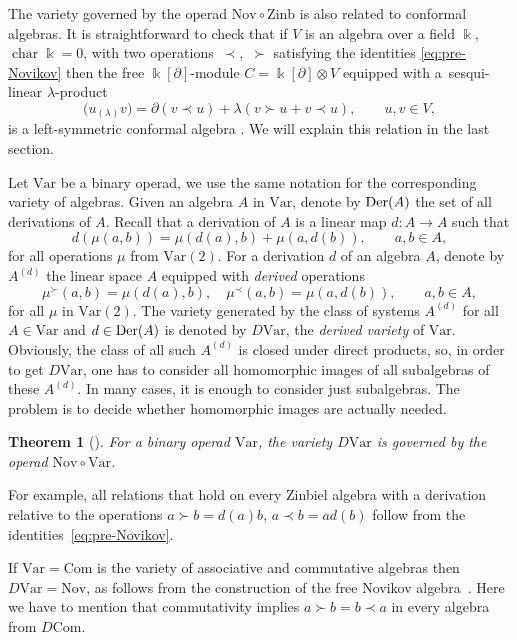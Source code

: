 \documentclass[pdftex]{sigma}
\numberwithin{equation}{section}
\newtheorem{Theorem}{Theorem}[section]
\def\Var{\mathrm{Var}}
\def\Nov{\mathrm{Nov}}
\def\Com{\mathrm{Com}}
\def\Zinb{\mathrm{Zinb}}
\def\Der {\mathop {\fam 0 Der}\nolimits}
\begin{document}
\begin{Remark}\label{rem:Conformal}
The variety governed by the operad $\Nov\circ \Zinb $
is also related to conformal algebras.
It is straightforward to check that if $V$ is an algebra over a field $\Bbbk $, $\operatorname{char}\Bbbk =0$, with two
operations~$\prec$,~$\succ $ satisfying the identities
\eqref{eq:pre-Novikov}
then the free
$\Bbbk [\partial ]$-module $C=\Bbbk[\partial ]\otimes V$
equipped with a~sesqui-linear $\lambda $-product
\[
\bigl(u{}_{(\lambda )} v\bigr) = \partial (v\prec u) + \lambda (v\succ u + v\prec u),
\qquad u,v\in V,
\]
is a left-symmetric conformal algebra \cite{HongLi2015}.
We will explain this relation in the last section.
\end{Remark}

Let $\Var $ be a binary operad, we use the same notation for the
corresponding variety of algebras.
Given an algebra $A$ in $\Var $, denote by $\Der(A) $
the set of all derivations of $A$. Recall that
a derivation of $A$ is a linear map $d\colon A\to A$
such that
\[
 d(\mu(a,b)) = \mu(d(a),b) + \mu(a,d(b)), \qquad a,b\in A,
\]
for all operations $\mu $ from $\Var (2)$.
For a derivation $d$ of an algebra $A$, denote by
$A^{(d)}$ the linear space $A$ equipped with {\em derived}
operations
%
\begin{equation}\label{eq:Der-op}
 \mu^{\succ }(a,b) = \mu(d(a),b), \quad \mu^{\prec }(a,b) = \mu(a,d(b)), \qquad a,b\in A,
\end{equation}
%
for all $\mu $ in $\Var (2)$.
The variety generated by the class of systems $A^{(d)}$ for all $A\in \Var$ and $d\in \Der(A)$
is denoted by $D\Var$, the {\em derived variety} of $\Var $.
Obviously, the class of all such $A^{(d)}$ is closed under direct products,
so, in order to get $D\Var$, one has to consider all homomorphic images of all subalgebras of these $A^{(d)}$.
In many cases, it is enough to consider just subalgebras.
The problem is to decide whether homomorphic images are actually needed.

\begin{Theorem}[\cite{KSO2019}]
For a binary operad $\Var $, the variety $D\Var $ is governed
by the operad ${\Nov\circ \Var}$.
\end{Theorem}

For example,
all relations that hold
on every Zinbiel algebra with a derivation relative to
the operations $a\succ b = d(a)b$, $a\prec b = ad(b)$
follow from the identities~\eqref{eq:pre-Novikov}.

If $\Var = \Com$ is the variety of associative and commutative algebras
then $D\Var = \Nov$, as follows from the construction of the free Novikov
algebra~\cite{DzhLofwall2002}. Here we have to mention
that commutativity implies $a\succ b = b\prec a$ in every
algebra from $D\Com $.
\end{document}
